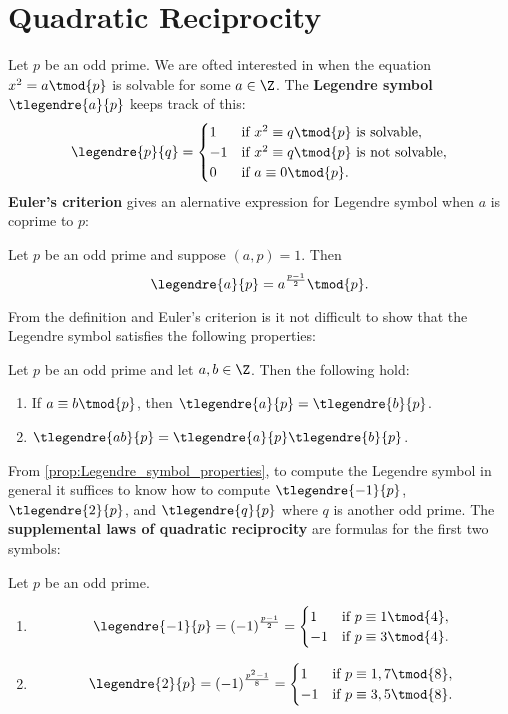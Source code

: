   \section{Quadratic Reciprocity}
    Let $p$ be an odd prime. We are ofted interested in when the equation $x^{2} = a \tmod{p}$ is solvable for some $a \in \Z$. The \textbf{Legendre symbol} $\tlegendre{a}{p}$ keeps track of this:
    \[
      \legendre{p}{q} = \begin{cases} 1 & \text{if $x^{2} \equiv q \tmod{p}$ is solvable}, \\ -1 & \text{if $x^{2} \equiv q \tmod{p}$ is not solvable}, \\ 0 & \text{if $a \equiv 0 \tmod{p}$}. \end{cases}
    \]
    \textbf{Euler's criterion} gives an alernative expression for Legendre symbol when $a$ is coprime to $p$:
    \begin{proposition}
      Let $p$ be an odd prime and suppose $(a,p) = 1$. Then
      \[
        \legendre{a}{p} = a^{\frac{p-1}{2}} \tmod{p}.
      \]
    \end{proposition}
    From the definition and Euler's criterion is it not difficult to show that the Legendre symbol satisfies the following properties:
    \begin{proposition}\label{prop:Legendre_symbol_properties}
      Let $p$ be an odd prime and let $a,b \in \Z$. Then the following hold:
      \begin{enumerate}[label=(\roman*)]
        \item If $a \equiv b \tmod{p}$, then $\tlegendre{a}{p} = \tlegendre{b}{p}$.
        \item $\tlegendre{ab}{p} = \tlegendre{a}{p}\tlegendre{b}{p}$.
      \end{enumerate}
    \end{proposition}
    From \cref{prop:Legendre_symbol_properties}, to compute the Legendre symbol in general it suffices to know how to compute $\tlegendre{-1}{p}$, $\tlegendre{2}{p}$, and $\tlegendre{q}{p}$ where $q$ is another odd prime. The \textbf{supplemental laws of quadratic reciprocity} are formulas for the first two symbols:
    \begin{proposition}
      Let $p$ be an odd prime.
      \begin{enumerate}[label=(\roman*)]
        \item
        \[
          \legendre{-1}{p} = (-1)^{\frac{p-1}{2}} = \begin{cases} 1 & \text{if $p \equiv 1 \tmod{4}$}, \\ -1 & \text{if $p \equiv 3 \tmod{4}$}. \end{cases}
        \]
        \item
        \[
          \legendre{2}{p} = (-1)^{\frac{p^{2}-1}{8}} = \begin{cases} 1 & \text{if $p \equiv 1,7 \tmod{8}$}, \\ -1 & \text{if $p \equiv 3,5 \tmod{8}$}. \end{cases}
        \]
      \end{enumerate}
    \end{proposition}
